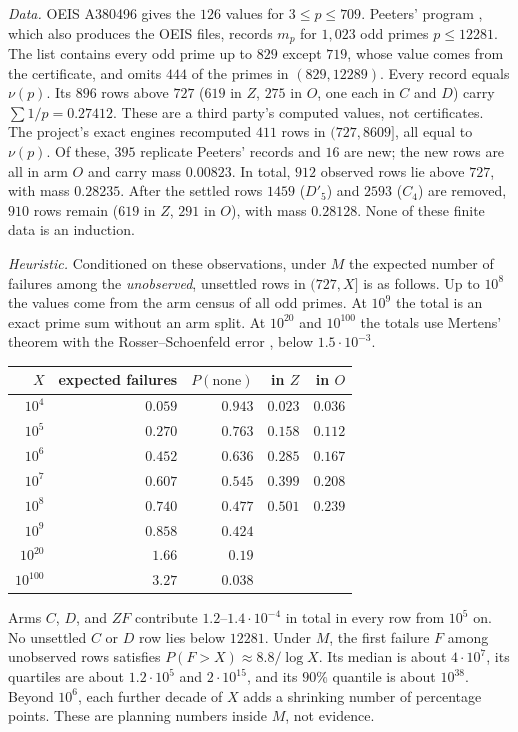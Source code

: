 \emph{Data.}  OEIS A380496 \cite{oeisA380496} gives the $126$ values for
$3\leq p\leq709$.  Peeters' program \cite{peeters2026}, which also produces
the OEIS files, records $m_p$ for $1{,}023$ odd primes $p\leq12281$.  The list
contains every odd prime up to $829$ except $719$, whose value comes from the
certificate, and omits $444$ of the primes in $(829,12289)$.  Every record
equals $\nu(p)$.  Its $896$ rows above $727$ ($619$ in $Z$, $275$ in $O$, one
each in $C$ and $D$) carry $\sum1/p=0.27412$.  These are a third party's
computed values, not certificates.  The project's exact engines recomputed
$411$ rows in $(727,8609]$, all equal to $\nu(p)$.  Of these, $395$ replicate
Peeters' records and $16$ are new; the new rows are all in arm $O$ and carry
mass $0.00823$.  In total, $912$ observed rows lie above $727$, with mass
$0.28235$.  After the settled rows $1459$ ($D'_5$) and $2593$ ($C_4$) are
removed, $910$ rows remain ($619$ in $Z$, $291$ in $O$), with mass
$0.28128$.  None of these finite data is an induction.

\emph{Heuristic.}  Conditioned on these observations, under $M$ the expected
number of failures among the \emph{unobserved}, unsettled rows in $(727,X]$
is as follows.  Up to $10^8$ the values come from the arm census of all odd
primes.  At $10^9$ the total is an exact prime sum without an arm split.  At
$10^{20}$ and $10^{100}$ the totals use Mertens' theorem with the
Rosser--Schoenfeld error \cite{rosserschoenfeld1962}, below $1.5\cdot10^{-3}$.
\begin{center}
\small
\begin{tabular}{rrrrr}
\hline
$X$ & expected failures & $P(\text{none})$ & in $Z$ & in $O$\\
\hline
$10^4$   & $0.059$ & $0.943$ & $0.023$ & $0.036$\\
$10^5$   & $0.270$ & $0.763$ & $0.158$ & $0.112$\\
$10^6$   & $0.452$ & $0.636$ & $0.285$ & $0.167$\\
$10^7$   & $0.607$ & $0.545$ & $0.399$ & $0.208$\\
$10^8$   & $0.740$ & $0.477$ & $0.501$ & $0.239$\\
$10^9$   & $0.858$ & $0.424$ & & \\
$10^{20}$  & $1.66$ & $0.19$ & & \\
$10^{100}$ & $3.27$ & $0.038$ & & \\
\hline
\end{tabular}
\end{center}
Arms $C$, $D$, and $ZF$ contribute $1.2$--$1.4\cdot10^{-4}$ in total in
every row from $10^5$ on.  No unsettled $C$ or $D$ row lies below $12281$.
Under $M$, the first failure $F$ among unobserved rows satisfies
$P(F>X)\approx8.8/\log X$.  Its median is about $4\cdot10^7$, its quartiles
are about $1.2\cdot10^5$ and $2\cdot10^{15}$, and its $90\%$ quantile is about
$10^{38}$.  Beyond $10^6$, each further decade of $X$ adds a shrinking
number of percentage points.  These are planning numbers inside $M$, not
evidence.


